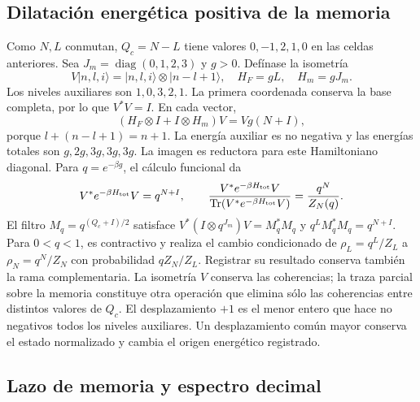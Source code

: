 \subsection{Dilatación energética positiva de la memoria}
\label{sec:ii-ter27-memoria}

Como $N,L$ conmutan, $Q_c=N-L$ tiene valores $0,-1,2,1,0$ en las
celdas anteriores. Sea $J_m=\operatorname{diag}(0,1,2,3)$ y $g>0$.
Defínase la isometría
\begin{equation}
 V|n,l,i\rangle=|n,l,i\rangle\otimes|n-l+1\rangle,
 \quad H_F=gL,\quad H_m=gJ_m.
 \label{eq:ii-ter27-lift}
\end{equation}
Los niveles auxiliares son $1,0,3,2,1$. La primera coordenada conserva
la base completa, por lo que $V^*V=I$. En cada vector,
\begin{equation}
 (H_F\otimes I+I\otimes H_m)V=Vg(N+I),
 \label{eq:ii-ter27-energia-memoria}
\end{equation}
porque $l+(n-l+1)=n+1$. La energía auxiliar es no negativa y las
energías totales son $g,2g,3g,3g,3g$. La imagen es reductora para este
Hamiltoniano diagonal. Para $q=e^{-\beta g}$, el cálculo funcional da
\[
 V^*e^{-\beta H_{\rm tot}}V=q^{N+I},\qquad
 \frac{V^*e^{-\beta H_{\rm tot}}V}
 {\operatorname{Tr}(V^*e^{-\beta H_{\rm tot}}V)}=\frac{q^N}{Z_N(q)}.
\]
El filtro $M_q=q^{(Q_c+I)/2}$ satisface
$V^*(I\otimes q^{J_m})V=M_q^*M_q$ y
$q^L M_q^*M_q=q^{N+I}$. Para $0<q<1$, es contractivo y realiza el
cambio condicionado de $\rho_L=q^L/Z_L$ a $\rho_N=q^N/Z_N$ con
probabilidad $qZ_N/Z_L$. Registrar su resultado conserva también la
rama complementaria. La isometría $V$ conserva las coherencias; la traza
parcial sobre la memoria constituye otra operación que elimina sólo las
coherencias entre distintos valores de $Q_c$.
El desplazamiento $+1$ es el menor entero que hace no negativos todos
los niveles auxiliares. Un desplazamiento común mayor conserva el estado
normalizado y cambia el origen energético registrado.

\subsection{Lazo de memoria y espectro decimal}
\label{sec:ii-ter27-espectro}

